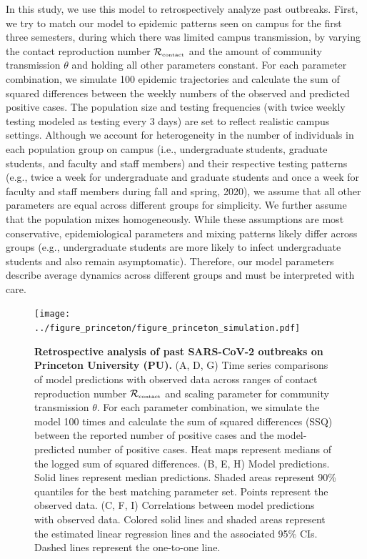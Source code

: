\documentclass[12pt]{article}
\newcommand{\Rx}[1]{\ensuremath{{\mathcal R}_{#1}}}
\newcommand{\Rc}{\Rx{\textrm{\tiny{contact}}}}
\begin{document}
In this study, we use this model to retrospectively analyze past outbreaks.
First, we try to match our model to epidemic patterns seen on campus for the first three semesters, during which there was limited campus transmission, by varying the contact reproduction number $\Rc$ and the amount of community transmission $\theta$ and holding all other parameters constant.
For each parameter combination, we simulate 100 epidemic trajectories and calculate the sum of squared differences between the weekly numbers of the observed and predicted positive cases.
The population size and testing frequencies (with twice weekly testing modeled as testing every 3 days) are set to reflect realistic campus settings.
Although we account for heterogeneity in the number of individuals in each population group on campus (i.e., undergraduate students, graduate students, and faculty and staff members) and their respective testing patterns (e.g., twice a week for undergraduate and graduate students and once a week for faculty and staff members during fall and spring, 2020), we assume that all other parameters are equal across different groups for simplicity. 
We further assume that the population mixes homogeneously.
While these assumptions are most conservative, epidemiological parameters  and mixing patterns likely differ across groups (e.g., undergraduate students are more likely to infect undergraduate students and also remain asymptomatic).
Therefore, our model parameters describe average dynamics across different groups and must be interpreted with care.

\begin{figure}[!th]
\texttt{[image: ../figure\_princeton/figure\_princeton\_simulation.pdf]}
\caption{
\textbf{Retrospective analysis of past SARS-CoV-2 outbreaks on Princeton University (PU).}
(A, D, G) Time series comparisons of model predictions with observed data across ranges of contact reproduction number $\Rc$ and scaling parameter for community transmission $\theta$.
For each parameter combination, we simulate the model 100 times and calculate the sum of squared differences (SSQ) between the reported number of positive cases and the model-predicted number of positive cases. 
Heat maps represent medians of the logged sum of squared differences.
(B, E, H) Model predictions. 
Solid lines represent median predictions.
Shaded areas represent 90\% quantiles for the best matching parameter set.
Points represent the observed data.
(C, F, I) Correlations between model predictions with observed data.
Colored solid lines and shaded areas represent the estimated linear regression lines and the associated 95\% CIs.
Dashed lines represent the one-to-one line.
\label{fig:matching}
}
\end{figure}
\end{document}
